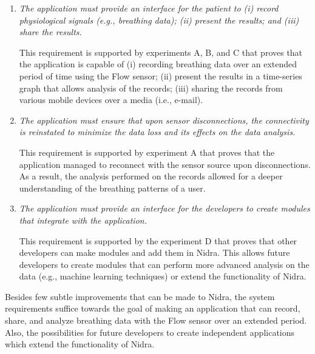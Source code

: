 \begin{enumerate}
    \item \textit{The application must provide an interface for the patient to (i) record physiological signals (e.g., breathing data); (ii) present the results; and (iii) share the results.}
    
    This requirement is supported by experiments A, B, and C that proves that the application is capable of (i) recording breathing data over an extended period of time using the Flow sensor; (ii) present the results in a time-series graph that allows analysis of the records; (iii) sharing the records from various mobile devices over a media (i.e., e-mail).

    \item \textit{The application must ensure that upon sensor disconnections, the connectivity is reinstated to minimize the data loss and its effects on the data analysis.}
    
    This requirement is supported by experiment A that proves that the application managed to reconnect with the sensor source upon disconnections. As a result, the analysis performed on the records allowed for a deeper understanding of the breathing patterns of a user. 

    \item \textit{The application must provide an interface for the developers to create modules that integrate with the application.}
    
    This requirement is supported by the experiment D that proves that other developers can make modules and add them in Nidra. This allows future developers to create modules that can perform more advanced analysis on the data (e.g., machine learning techniques) or extend the functionality of Nidra.

\end{enumerate}

Besides few subtle improvements that can be made to Nidra, the system requirements suffice towards the goal of making an application that can record, share, and analyze breathing data with the Flow sensor over an extended period. Also, the possibilities for future developers to create independent applications which extend the functionality of Nidra.



